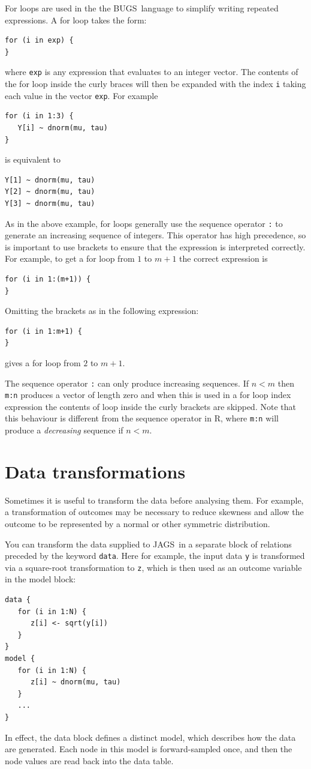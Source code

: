 \documentclass[11pt, a4paper, titlepage]{report}
\newcommand{\JAGS}{\textsf{JAGS}}
\newcommand{\BUGS}{\textsf{BUGS}}
\newcommand{\R}{\textsf{R}}
\begin{document}
For loops are used in the the \BUGS\ language to simplify writing
repeated expressions. A for loop takes the form:
\begin{verbatim}
for (i in exp) {
}
\end{verbatim}
where \texttt{exp} is any expression that evaluates to an integer
vector. The contents of the for loop inside the curly braces will then
be expanded with the index \texttt{i} taking each value in the vector
\texttt{exp}. For example
\begin{verbatim}
for (i in 1:3) {
   Y[i] ~ dnorm(mu, tau)
}
\end{verbatim}
is equivalent to
\begin{verbatim}
Y[1] ~ dnorm(mu, tau)
Y[2] ~ dnorm(mu, tau)
Y[3] ~ dnorm(mu, tau)
\end{verbatim}
As in the above example, for loops generally use the sequence operator
\verb+:+ to generate an increasing sequence of integers. This operator
has high precedence, so is important to use brackets to ensure that
the expression is interpreted correctly. For example, to get a for
loop from $1$ to $m+1$ the correct expression is
\begin{verbatim}
for (i in 1:(m+1)) {
}
\end{verbatim}
Omitting the brackets as in the following expression:
\begin{verbatim}
for (i in 1:m+1) {
}
\end{verbatim}
gives a for loop from $2$ to $m+1$.

The sequence operator \verb+:+ can only produce increasing
sequences. If $n < m$ then \verb+m:n+ produces a vector of length zero
and when this is used in a for loop index expression the contents of
loop inside the curly brackets are skipped. Note that this behaviour
is different from the sequence operator in \R, where \verb+m:n+ will
produce a {\em decreasing} sequence if $n < m$.

\section{Data transformations}
\label{section:data:tranformations}

Sometimes it is useful to transform the data before analysing them.
For example, a transformation of outcomes may be necessary to
reduce skewness and allow the outcome to be represented by a normal
or other symmetric distribution.

You can transform the data supplied to \JAGS\ in a separate block of
relations preceded by the keyword \texttt{data}. Here for example,
the input data \texttt{y} is transformed via a square-root transformation
to \texttt{z}, which is then used as an outcome variable in the model block:
\begin{verbatim}
data {
   for (i in 1:N) {
      z[i] <- sqrt(y[i])
   }
}
model {
   for (i in 1:N) {
      z[i] ~ dnorm(mu, tau)
   }
   ...
}
\end{verbatim}
In effect, the data block defines a distinct model, which describes
how the data are generated. Each node in this model is forward-sampled
once, and then the node values are read back into the data table.
\end{document}
